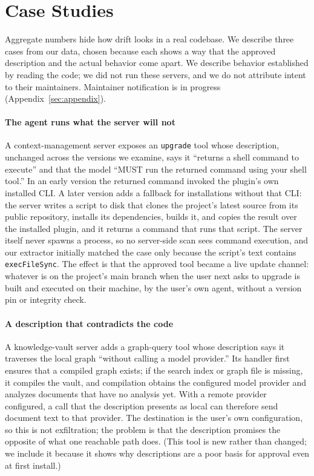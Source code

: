 \section{Case Studies}\label{sec:cases}

Aggregate numbers hide how drift looks in a real codebase. We describe three cases from our data, chosen because each shows a way that the approved description and the actual behavior come apart. We describe behavior established by reading the code; we did not run these servers, and we do not attribute intent to their maintainers. Maintainer notification is in progress (Appendix~\ref{sec:appendix}).

\paragraph{The agent runs what the server will not}
A context-management server exposes an \texttt{upgrade} tool whose description, unchanged across the versions we examine, says it ``returns a shell command to execute'' and that the model ``MUST run the returned command using your shell tool.'' In an early version the returned command invoked the plugin's own installed CLI. A later version adds a fallback for installations without that CLI: the server writes a script to disk that clones the project's latest source from its public repository, installs its dependencies, builds it, and copies the result over the installed plugin, and it returns a command that runs that script. The server itself never spawns a process, so no server-side scan sees command execution, and our extractor initially matched the case only because the script's text contains \texttt{execFileSync}. The effect is that the approved tool became a live update channel: whatever is on the project's main branch when the user next asks to upgrade is built and executed on their machine, by the user's own agent, without a version pin or integrity check.

\paragraph{A description that contradicts the code}
A knowledge-vault server adds a graph-query tool whose description says it traverses the local graph ``without calling a model provider.'' Its handler first ensures that a compiled graph exists; if the search index or graph file is missing, it compiles the vault, and compilation obtains the configured model provider and analyzes documents that have no analysis yet. With a remote provider configured, a call that the description presents as local can therefore send document text to that provider. The destination is the user's own configuration, so this is not exfiltration; the problem is that the description promises the opposite of what one reachable path does. (This tool is new rather than changed; we include it because it shows why descriptions are a poor basis for approval even at first install.)


